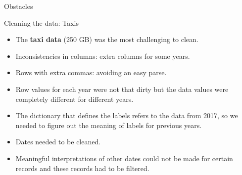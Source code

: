 \documentclass[10pt,ignorenonframetext,]{beamer}
\providecommand{\tightlist}{%
  \setlength{\itemsep}{0pt}\setlength{\parskip}{0pt}}
\begin{document}
\begin{frame}{%
\protect\hypertarget{obstacles}{%
Obstacles}}

\begin{block}{Cleaning the data: Taxis}

\begin{itemize}[<+->]
\tightlist
\item
  The \textbf{taxi data} (250 GB) was the most challenging to clean.
\end{itemize}

\begin{itemize}[<+->]
\tightlist
\item
  Inconsistencies in columns: extra columns for some years.
\end{itemize}

\begin{itemize}[<+->]
\tightlist
\item
  Rows with extra commas: avoiding an easy parse.
\end{itemize}

\begin{itemize}[<+->]
\tightlist
\item
  Row values for each year were not that dirty but the data values were
  completely different for different years.
\end{itemize}

\begin{itemize}[<+->]
\tightlist
\item
  The dictionary that defines the labels refers to the data from 2017,
  so we needed to figure out the meaning of labels for previous years.
\end{itemize}

\begin{itemize}[<+->]
\tightlist
\item
  Dates needed to be cleaned.
\end{itemize}

\begin{itemize}[<+->]
\tightlist
\item
  Meaningful interpretations of other dates could not be made for
  certain records and these records had to be filtered.
\end{itemize}

\end{block}

\end{frame}
\end{document}
